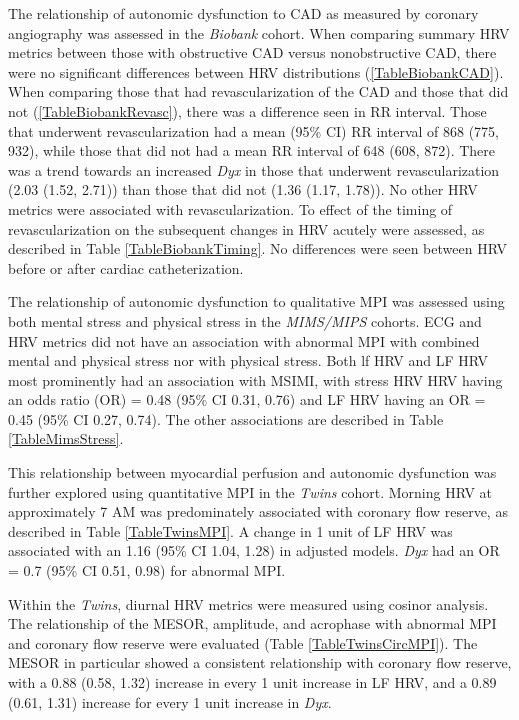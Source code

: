 \documentclass[
  11pt,
  openany]{book}
\begin{document}
The relationship of autonomic dysfunction to CAD as measured by coronary angiography was assessed in the \emph{Biobank} cohort.
When comparing summary HRV metrics between those with obstructive CAD versus nonobstructive CAD, there were no significant differences between HRV distributions (\ref{TableBiobankCAD}).
When comparing those that had revascularization of the CAD and those that did not (\ref{TableBiobankRevasc}), there was a difference seen in RR interval.
Those that underwent revascularization had a mean (95\% CI) RR interval of 868 (775, 932), while those that did not had a mean RR interval of 648 (608, 872).
There was a trend towards an increased \emph{Dyx} in those that underwent revascularization (2.03 (1.52, 2.71)) than those that did not (1.36 (1.17, 1.78)).
No other HRV metrics were associated with revascularization.
To effect of the timing of revascularization on the subsequent changes in HRV acutely were assessed, as described in Table \ref{TableBiobankTiming}.
No differences were seen between HRV before or after cardiac catheterization.

The relationship of autonomic dysfunction to qualitative MPI was assessed using both mental stress and physical stress in the \emph{MIMS/MIPS} cohorts.
ECG and HRV metrics did not have an association with abnormal MPI with combined mental and physical stress nor with physical stress.
Both lf HRV and LF HRV most prominently had an association with MSIMI, with stress HRV HRV having an odds ratio (OR) = 0.48 (95\% CI 0.31, 0.76) and LF HRV having an OR = 0.45 (95\% CI 0.27, 0.74).
The other associations are described in Table \ref{TableMimsStress}.

This relationship between myocardial perfusion and autonomic dysfunction was further explored using quantitative MPI in the \emph{Twins} cohort.
Morning HRV at approximately 7 AM was predominately associated with coronary flow reserve, as described in Table \ref{TableTwinsMPI}.
A change in 1 unit of LF HRV was associated with an 1.16 (95\% CI 1.04, 1.28) in adjusted models.
\emph{Dyx} had an OR = 0.7 (95\% CI 0.51, 0.98) for abnormal MPI.

Within the \emph{Twins}, diurnal HRV metrics were measured using cosinor analysis.
The relationship of the MESOR, amplitude, and acrophase with abnormal MPI and coronary flow reserve were evaluated (Table \ref{TableTwinsCircMPI}).
The MESOR in particular showed a consistent relationship with coronary flow reserve, with a 0.88 (0.58, 1.32) increase in every 1 unit increase in LF HRV, and a 0.89 (0.61, 1.31) increase for every 1 unit increase in \emph{Dyx}.
\end{document}
